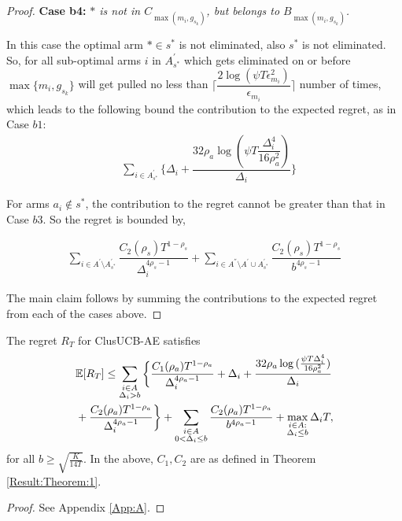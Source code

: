 \begin{proof}
\textbf{Case b4:} \textit{${*}$ is not in $C_{\max(m_{i},g_{s_{k}})}$, but belongs to $B_{\max(m_{i},g_{s_{k}})}$.}

In this case the optimal arm ${*}\in s^{*}$ is not eliminated, also $s^{*}$ is not eliminated. So, for all sub-optimal arms $i$ in $A_{s^*}^{'}$ which gets eliminated on or before $\max \lbrace m_{i},g_{s_{k}} \rbrace$ will get pulled no less than $\bigg\lceil\dfrac{2\log{(\psi T\epsilon_{m_{i}}^{2})}}{\epsilon_{m_{i}}}\bigg\rceil$ number of times, which leads to the following bound the contribution to the expected regret, as in Case $b1$:
\begin{align*}
 &\sum_{i\in A_{s^*}^{'}}\bigg\lbrace \Delta_{i}+\dfrac{32\rho_{a}\log{(\psi T\dfrac{\Delta_{i}^{4}}{16\rho_{a}^{2}})}}{\Delta_{i}} \bigg\rbrace 
\end{align*} 

For arms $a_i \notin s^*$, the contribution to the regret cannot be greater than that in Case $b3$. So the regret is bounded by,

\begin{align*}
\sum_{i\in A^{'}\setminus A_{s^*}^{'}}\dfrac{C_{2}(\rho_{s})T^{1-\rho_{s}}}{\Delta_{i}^{4\rho_{s}-1}} +\sum_{i\in A^{''}\setminus A^{'} \cup A_{s^*}^{'}}\dfrac{C_{2}(\rho_{s})T^{1-\rho_{s}}}{b^{4\rho_{s}-1}}
\end{align*}




The main claim follows by summing the contributions to the expected regret from each of the cases above.
\end{proof}


\begin{proposition}
\label{proofTheorem:Prop:1}
The regret $R_T$ for ClusUCB-AE satisfies
\begin{align*}
&\mathbb{E} [R_{T}]\leq \sum\limits_{\substack{i\in A\\\Delta_{i} > b}}\bigg\lbrace\frac{C_{1}(\rho_{a})T^{1-\rho_{a}}}{\Delta_{i}^{4\rho_{a}-1}} + \Delta_{i}+\frac{32\rho_{a}\log{(\frac{\psi  T\Delta_{i}^{4}}{16\rho_{a}^{2}})}}{\Delta_{i}}\\
& +  \frac{C_{2}(\rho_{a})T^{1-\rho_{a}}}{\Delta_{i}^{4\rho_{a} -1}}  \bigg \rbrace +\sum\limits_{\substack{i\in A\\0 <\Delta_{i}\leq b}}\frac{C_{2}(\rho_{a})T^{1-\rho_{a}}}{b^{4\rho_{a} -1}}  + \max_{\substack{i\in A: \\ \Delta_{i}\leq b}}\Delta_{i}T,
\end{align*}
for all $b\geq\sqrt{\frac{K}{14 T}}$. In the above, $C_1, C_2$ are as defined in Theorem \ref{Result:Theorem:1}.
\end{proposition}
\begin{proof}
See Appendix \ref{App:A}.
\end{proof}

